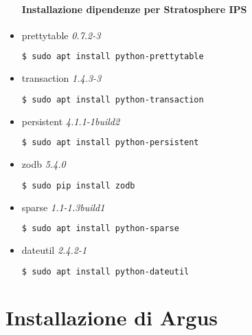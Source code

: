 \documentclass[../main.tex]{subfiles}
\begin{document}
\begin{itemize}
				\paragraph{Installazione dipendenze per Stratosphere IPS}

				\item prettytable \textit{0.7.2-3}
\begin{lstlisting}[language=bash]
$ sudo apt install python-prettytable
\end{lstlisting}

				\item transaction \textit{1.4.3-3}
\begin{lstlisting}[language=bash]
$ sudo apt install python-transaction
\end{lstlisting}

				\item persistent \textit{4.1.1-1build2}
\begin{lstlisting}[language=bash]
$ sudo apt install python-persistent
\end{lstlisting}

				\item zodb \textit{5.4.0}
\begin{lstlisting}[language=bash]
$ sudo pip install zodb
\end{lstlisting}

				\item sparse \textit{1.1-1.3build1}
\begin{lstlisting}[language=bash]
$ sudo apt install python-sparse
\end{lstlisting}

				\item dateutil \textit{2.4.2-1}
\begin{lstlisting}[language=bash]
$ sudo apt install python-dateutil
\end{lstlisting}


\end{itemize}

\section{Installazione di Argus}
\end{document}
